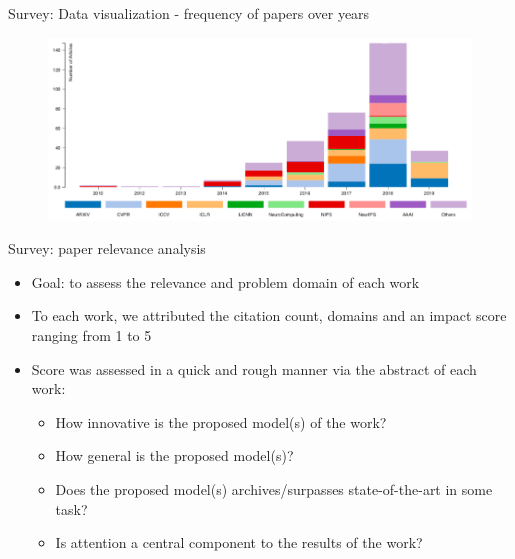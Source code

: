 \documentclass[10pt]{beamer}
\begin{document}
\begin{frame}{Survey: Data visualization - frequency of papers over years}
    \begin{figure}
    \begin{center}
        \includegraphics[width=1.0\linewidth]{./img/n_articles.png}
    \end{center}
    \end{figure}
\end{frame}

\begin{frame}{Survey: paper relevance analysis}
    \begin{itemize}
        \item Goal: to assess the relevance and problem domain of each work
        \item To each work, we attributed the citation count, domains and an impact score ranging from 1 to 5
        \item Score was assessed in a quick and rough manner via the abstract of each work:
            \begin{itemize}
                \item How innovative is the proposed model(s) of the work?
                \item How general is the proposed model(s)?
                \item Does the proposed model(s) archives/surpasses state-of-the-art in some task?
                \item Is attention a central component to the results of the work?
            \end{itemize}
    \end{itemize}
\end{frame}
\end{document}

